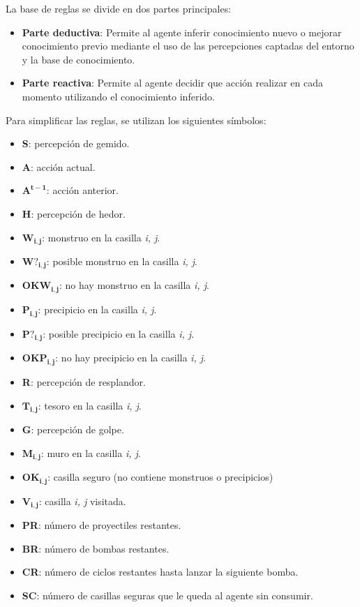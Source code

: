 La base de reglas se divide en dos partes principales:
\begin{itemize}
    \item \textbf{Parte deductiva}: Permite al agente inferir conocimiento nuevo o mejorar conocimiento previo mediante el uso de las percepciones captadas del entorno y la base de conocimiento.
    \item \textbf{Parte reactiva}: Permite al agente decidir que acción realizar en cada momento utilizando el conocimiento inferido.
\end{itemize}

Para simplificar las reglas, se utilizan los siguientes símbolos:
\begin{itemize}
    \item \textbf{S}: percepción de gemido.
    \item \textbf{A}: acción actual.
    \item $\mathbf{A^{t-1}}$: acción anterior.
    \item \textbf{H}: percepción de hedor.
    \item $\mathbf{W_{i, j}}$: monstruo en la casilla \emph{i, j}.
    \item $\mathbf{W?_{i, j}}$: posible monstruo en la casilla \emph{i, j}. 
    \item $\mathbf{OKW_{i, j}}$: no hay monstruo en la casilla \emph{i, j}. 
    \item $\mathbf{P_{i, j}}$: precipicio en la casilla \emph{i, j}.
    \item $\mathbf{P?_{i, j}}$: posible precipicio en la casilla \emph{i, j}. 
    \item $\mathbf{OKP_{i, j}}$: no hay precipicio en la casilla \emph{i, j}. 
    \item \textbf{R}: percepción de resplandor.
    \item $\mathbf{T_{i, j}}$: tesoro en la casilla \emph{i, j}.
    \item \textbf{G}: percepción de golpe.
    \item $\mathbf{M_{i, j}}$: muro en la casilla \emph{i, j}.
    \item $\mathbf{OK_{i, j}}$: casilla seguro (no contiene monstruos o precipicios)
    \item $\mathbf{V_{i, j}}$: casilla \emph{i, j} visitada.
    \item \textbf{PR}: número de proyectiles restantes.
    \item \textbf{BR}: número de bombas restantes.
    \item \textbf{CR}: número de ciclos restantes hasta lanzar la siguiente bomba.
    \item \textbf{SC}: número de casillas seguras que le queda al agente sin consumir.
\end{itemize}

